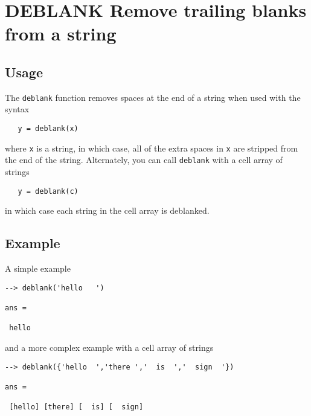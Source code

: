 \section{DEBLANK Remove trailing blanks from a string}

\subsection{Usage}

The \verb|deblank| function removes spaces at the end of a string
when used with the syntax
\begin{verbatim}
   y = deblank(x)
\end{verbatim}
where \verb|x| is a string, in which case, all of the extra spaces
in \verb|x| are stripped from the end of the string.  Alternately,
you can call \verb|deblank| with a cell array of strings
\begin{verbatim}
   y = deblank(c)
\end{verbatim}
in which case each string in the cell array is deblanked.
\subsection{Example}

A simple example
\begin{verbatim}
--> deblank('hello   ')

ans = 

 hello
\end{verbatim}
and a more complex example with a cell array of strings
\begin{verbatim}
--> deblank({'hello  ','there ','  is  ','  sign  '})

ans = 

 [hello] [there] [  is] [  sign] 
\end{verbatim}
